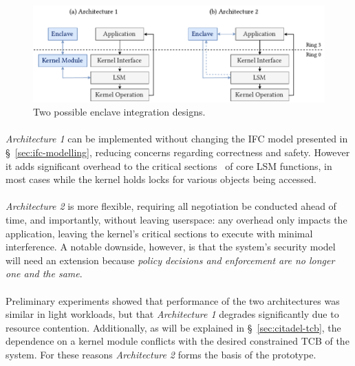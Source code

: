 \begin{figure}[]
    \centering
    \includegraphics[width=0.98\linewidth]{figures/SGX-EnclaveIntegration-Design}
    \caption{Two possible enclave integration designs.}
    \vspace{2mm}
    \label{fig:sgx-integration}
    \vspace{5mm}
\end{figure}

\paragraph{}\textit{Architecture 1} can be implemented without changing the IFC model presented in §~\ref{sec:ifc-modelling}, reducing concerns regarding correctness and safety. However it adds significant overhead to the critical sections~\cite{Dubois1988SynchronizationCA} of core LSM functions, in most cases while the kernel holds locks for various objects being accessed.

\paragraph{} \textit{Architecture 2} is more flexible, requiring all negotiation be conducted ahead of time, and importantly, without leaving userspace: any overhead only impacts the application, leaving the kernel's critical sections to execute with minimal interference. A notable downside, however, is that the system's security model will need an extension because \textit{policy decisions and enforcement are no longer one and the same}.

\paragraph{} Preliminary experiments showed that performance of the two architectures was similar in light workloads, but that \textit{Architecture 1} degrades significantly due to resource contention. Additionally, as will be explained in §~\ref{sec:citadel-tcb}, the dependence on a kernel module conflicts with the desired constrained TCB of the system. For these reasons \textit{Architecture 2} forms the basis of the prototype.


